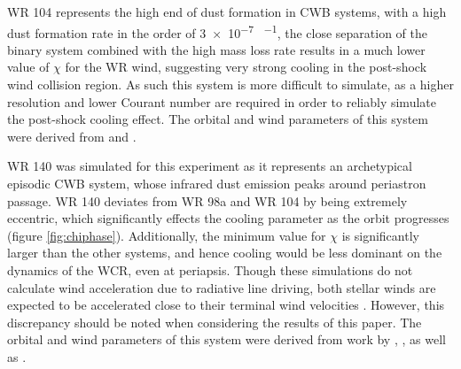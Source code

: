 WR 104 represents the high end of dust formation in CWB systems, with a high dust formation rate in the order of \num{3e-7} \si{\solarmass\per\year}, the close separation of the binary system combined with the high mass loss rate results in a much lower value of $\chi$ for the WR wind, suggesting very strong cooling in the post-shock wind collision region. As such this system is more difficult to simulate, as a higher resolution and lower Courant number are required in order to reliably simulate the post-shock cooling effect.
The orbital and wind parameters of this system were derived from \cite{soulain_sphere_2018} and \cite{harries_three-dimensional_2004}. 




WR 140 was simulated for this experiment as it represents an archetypical episodic CWB system, whose infrared dust emission peaks around periastron passage. WR 140 deviates from WR 98a and WR 104 by being extremely eccentric, which significantly effects the cooling parameter as the orbit progresses (figure \ref{fig:chiphase}). Additionally, the minimum value for $\chi$ is significantly larger than the other systems, and hence cooling would be less dominant on the dynamics of the WCR, even at periapsis. Though these simulations do not calculate wind acceleration due to radiative line driving, both stellar winds are expected to be accelerated close to their terminal wind velocities \parencite{lamersIntroductionStellarWinds1999}. However, this discrepancy should be noted when considering the results of this paper. %
The orbital and wind parameters of this system were derived from work by \cite{monnier_first_2011}, \cite{usov_stellar_1991}, as well as \cite{thomasOrbitStellarMasses2021}.

